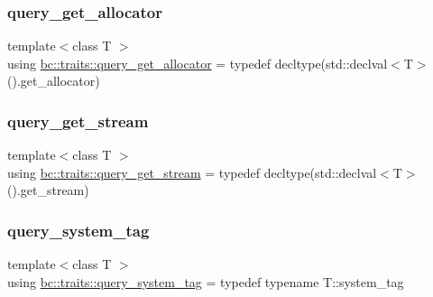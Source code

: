 \subsubsection{\texorpdfstring{query\+\_\+get\+\_\+allocator}{query\_get\_allocator}}
{\footnotesize\ttfamily template$<$class T $>$ \\
using \hyperlink{namespacebc_1_1traits_a7843a6596fe24415ac9e5eb4d804726a}{bc\+::traits\+::query\+\_\+get\+\_\+allocator} = typedef decltype(std\+::declval$<$T$>$().get\+\_\+allocator)}

\mbox{\label{namespacebc_1_1traits_ae56dfced2583c1fbec104bcbdc2f1b44}} 
\subsubsection{\texorpdfstring{query\+\_\+get\+\_\+stream}{query\_get\_stream}}
{\footnotesize\ttfamily template$<$class T $>$ \\
using \hyperlink{namespacebc_1_1traits_ae56dfced2583c1fbec104bcbdc2f1b44}{bc\+::traits\+::query\+\_\+get\+\_\+stream} = typedef decltype(std\+::declval$<$T$>$().get\+\_\+stream)}

\mbox{\label{namespacebc_1_1traits_acfa34d40f06d5122586d7adefdfeb42f}} 
\subsubsection{\texorpdfstring{query\+\_\+system\+\_\+tag}{query\_system\_tag}}
{\footnotesize\ttfamily template$<$class T $>$ \\
using \hyperlink{namespacebc_1_1traits_acfa34d40f06d5122586d7adefdfeb42f}{bc\+::traits\+::query\+\_\+system\+\_\+tag} = typedef typename T\+::system\+\_\+tag}

\mbox{\label{namespacebc_1_1traits_a40b9437a2ec1bb34ee7d506c8053f906}} 
